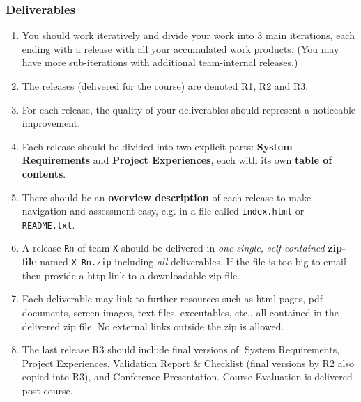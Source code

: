 \documentclass[10pt,a4paper]{article}
\begin{document}
\subsubsection{Deliverables}
 \begin{enumerate}[nolistsep]
\item You should work iteratively and divide your work into 3 main iterations, each ending with a release with all your accumulated work products. (You  may have more sub-iterations with additional team-internal releases.)
\item The releases (delivered for the course) are denoted R1, R2 and R3.
\item For each release, the quality of your deliverables should represent a noticeable improvement.
\item Each release should be divided into two explicit parts: {\bf System Requirements} and {\bf Project Experiences}, each with its own {\bf table of contents}.
\item There should be an {\bf overview description} of each release to make navigation and assessment  easy, e.g. in a file called \verb+index.html+ or \verb+README.txt+.
\item A release \verb+Rn+ of team \verb+X+ should be delivered in {\it one single, self-contained} {\bf zip-file} named \verb+X-Rn.zip+ including {\it all} deliverables. If the file is too big to email then provide a http link to a downloadable zip-file.

\item Each deliverable may link to further resources such as html pages, pdf documents, screen images, text files, executables, etc., all contained in the delivered zip file. No external links outside the zip is allowed.

\item The last release R3 should include final versions of: System Requirements, Project Experiences, Validation Report \& Checklist (final versions by R2 also copied into R3), and Conference Presentation. Course Evaluation is delivered post course.


\end{enumerate}
\end{document}
